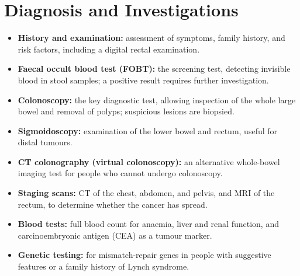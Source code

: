 \section*{Diagnosis and Investigations}
\begin{itemize}
    \item \textbf{History and examination:} assessment of symptoms, family history, and risk factors, including a digital rectal examination.
    \item \textbf{Faecal occult blood test (FOBT):} the screening test, detecting invisible blood in stool samples; a positive result requires further investigation.
    \item \textbf{Colonoscopy:} the key diagnostic test, allowing inspection of the whole large bowel and removal of polyps; suspicious lesions are biopsied.
    \item \textbf{Sigmoidoscopy:} examination of the lower bowel and rectum, useful for distal tumours.
    \item \textbf{CT colonography (virtual colonoscopy):} an alternative whole-bowel imaging test for people who cannot undergo colonoscopy.
    \item \textbf{Staging scans:} CT of the chest, abdomen, and pelvis, and MRI of the rectum, to determine whether the cancer has spread.
    \item \textbf{Blood tests:} full blood count for anaemia, liver and renal function, and carcinoembryonic antigen (CEA) as a tumour marker.
    \item \textbf{Genetic testing:} for mismatch-repair genes in people with suggestive features or a family history of Lynch syndrome.
\end{itemize}

